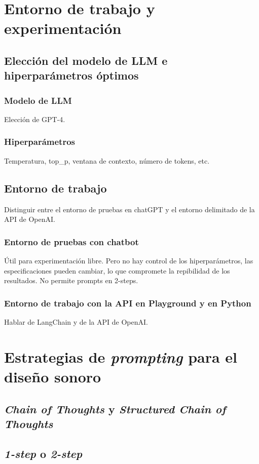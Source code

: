 \chapter{Entorno de trabajo y experimentación}
    \section{Elección del modelo de LLM e hiperparámetros óptimos}
        \subsection{Modelo de LLM}
            Elección de GPT-4.
        \subsection{Hiperparámetros}
            Temperatura, top\_p, ventana de contexto, número de tokens, etc.
    \section{Entorno de trabajo}
        Distinguir entre el entorno de pruebas en chatGPT y el entorno delimitado de la API de OpenAI.
        \subsection{Entorno de pruebas con chatbot}
            Útil para experimentación libre. Pero no hay control de los hiperparámetros, las especificaciones pueden cambiar, lo que compromete la repibilidad de los resultados. No permite prompts en 2-steps.
        \subsection{Entorno de trabajo con la API en Playground y en Python}
            Hablar de LangChain y de la API de OpenAI.

\chapter{Estrategias de \textit{prompting} para el diseño sonoro}
    \section{\textit{Chain of Thoughts} y \textit{Structured Chain of Thoughts}}
    \section{\textit{1-step} o \textit{2-step}}
